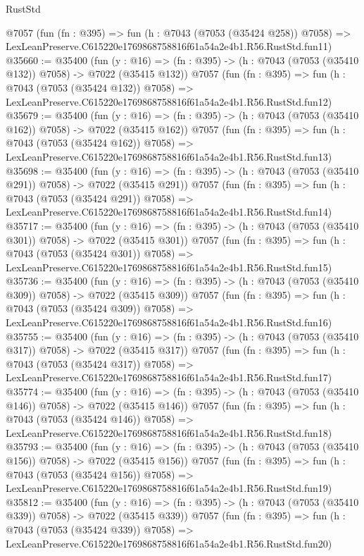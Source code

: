 \begin{lexlean}{RustStd}
\begin{coremodule}
    @7057
    (fun (fn : @395) =>
    fun (h : @7043 (@7053 (@35424 @258)) @7058) =>
    LexLeanPreserve.C615220e1769868758816f61a54a2e4b1.R56.RustStd.fun11)
@35660 := @35400
    (fun (y : @16) => (fn : @395) -> (h : @7043 (@7053 (@35410 @132)) @7058) -> @7022 (@35415 @132))
    @7057
    (fun (fn : @395) =>
    fun (h : @7043 (@7053 (@35424 @132)) @7058) =>
    LexLeanPreserve.C615220e1769868758816f61a54a2e4b1.R56.RustStd.fun12)
@35679 := @35400
    (fun (y : @16) => (fn : @395) -> (h : @7043 (@7053 (@35410 @162)) @7058) -> @7022 (@35415 @162))
    @7057
    (fun (fn : @395) =>
    fun (h : @7043 (@7053 (@35424 @162)) @7058) =>
    LexLeanPreserve.C615220e1769868758816f61a54a2e4b1.R56.RustStd.fun13)
@35698 := @35400
    (fun (y : @16) => (fn : @395) -> (h : @7043 (@7053 (@35410 @291)) @7058) -> @7022 (@35415 @291))
    @7057
    (fun (fn : @395) =>
    fun (h : @7043 (@7053 (@35424 @291)) @7058) =>
    LexLeanPreserve.C615220e1769868758816f61a54a2e4b1.R56.RustStd.fun14)
@35717 := @35400
    (fun (y : @16) => (fn : @395) -> (h : @7043 (@7053 (@35410 @301)) @7058) -> @7022 (@35415 @301))
    @7057
    (fun (fn : @395) =>
    fun (h : @7043 (@7053 (@35424 @301)) @7058) =>
    LexLeanPreserve.C615220e1769868758816f61a54a2e4b1.R56.RustStd.fun15)
@35736 := @35400
    (fun (y : @16) => (fn : @395) -> (h : @7043 (@7053 (@35410 @309)) @7058) -> @7022 (@35415 @309))
    @7057
    (fun (fn : @395) =>
    fun (h : @7043 (@7053 (@35424 @309)) @7058) =>
    LexLeanPreserve.C615220e1769868758816f61a54a2e4b1.R56.RustStd.fun16)
@35755 := @35400
    (fun (y : @16) => (fn : @395) -> (h : @7043 (@7053 (@35410 @317)) @7058) -> @7022 (@35415 @317))
    @7057
    (fun (fn : @395) =>
    fun (h : @7043 (@7053 (@35424 @317)) @7058) =>
    LexLeanPreserve.C615220e1769868758816f61a54a2e4b1.R56.RustStd.fun17)
@35774 := @35400
    (fun (y : @16) => (fn : @395) -> (h : @7043 (@7053 (@35410 @146)) @7058) -> @7022 (@35415 @146))
    @7057
    (fun (fn : @395) =>
    fun (h : @7043 (@7053 (@35424 @146)) @7058) =>
    LexLeanPreserve.C615220e1769868758816f61a54a2e4b1.R56.RustStd.fun18)
@35793 := @35400
    (fun (y : @16) => (fn : @395) -> (h : @7043 (@7053 (@35410 @156)) @7058) -> @7022 (@35415 @156))
    @7057
    (fun (fn : @395) =>
    fun (h : @7043 (@7053 (@35424 @156)) @7058) =>
    LexLeanPreserve.C615220e1769868758816f61a54a2e4b1.R56.RustStd.fun19)
@35812 := @35400
    (fun (y : @16) => (fn : @395) -> (h : @7043 (@7053 (@35410 @339)) @7058) -> @7022 (@35415 @339))
    @7057
    (fun (fn : @395) =>
    fun (h : @7043 (@7053 (@35424 @339)) @7058) =>
    LexLeanPreserve.C615220e1769868758816f61a54a2e4b1.R56.RustStd.fun20)

\end{coremodule}
\end{lexlean}
